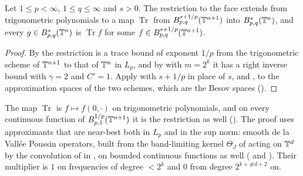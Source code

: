 \begin{theorem}
\label{thm:trace-torus}
\leanok
{}
Let $1 \leq p < \infty$, $1 \leq q \leq \infty$ and $s > 0$. The restriction to the face
extends from trigonometric polynomials to a map $\operatorname{Tr}$ from
$B^{s+1/p}_{p,q}(\mathbb{T}^{n+1})$ into $B^{s}_{p,q}(\mathbb{T}^n)$, and every
$g \in B^{s}_{p,q}(\mathbb{T}^n)$ is $\operatorname{Tr} f$ for some
$f \in B^{s+1/p}_{p,q}(\mathbb{T}^{n+1})$.
\end{theorem}

\begin{proof}
\leanok
{}
By  the restriction is a trace bound of exponent $1/p$ from
the trigonometric scheme of $\mathbb{T}^{n+1}$ to that of $\mathbb{T}^n$ in $L_p$, and by
 with $m = 2^k$ it has a right inverse bound with $\gamma = 2$ and
$C' = 1$. Apply  with $s + 1/p$ in place of $s$, and
, to the approximation spaces of the two schemes, which are the
Besov spaces ().
\end{proof}

The map $\operatorname{Tr}$ is $f \mapsto f(0, \cdot)$ on trigonometric polynomials, and on
every continuous function of $B^{1/p}_{p,1}(\mathbb{T}^{n+1})$ it is the restriction as well
(). The proof uses approximants that are near-best both in
$L_p$ and in the sup norm: smooth de la Vallée Poussin operators, built from the band-limiting
kernel $\Theta_J$ of  acting on $\mathbb{T}^d$ by the convolution of
 in , on bounded continuous functions as well
( and ). Their multiplier is $1$
on frequencies of degree $< 2^k$ and $0$ from degree $2^{k+\#d+2}$ on.


